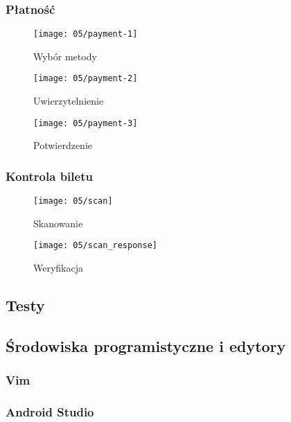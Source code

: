 \newpage

\subsubsection*{Płatność}

\begin{figure}[h]
	\centering
	\begin{minipage}[b]{0.3\textwidth}
		\texttt{[image: 05/payment-1]}
		\caption{Wybór metody}
	\end{minipage}
	\hfill
	\begin{minipage}[b]{0.3\textwidth}
		\texttt{[image: 05/payment-2]}
		\caption{Uwierzytelnienie}
	\end{minipage}
	\hfill
	\begin{minipage}[b]{0.3\textwidth}
		\texttt{[image: 05/payment-3]}
		\caption{Potwierdzenie}
	\end{minipage}
\end{figure}

\newpage

\subsubsection*{Kontrola biletu}

\begin{figure}[h]
	\centering
	\begin{minipage}[b]{0.35\textwidth}
		\texttt{[image: 05/scan]}
		\caption{Skanowanie}
	\end{minipage}
	\hspace{3cm}
	\begin{minipage}[b]{0.35\textwidth}
		\texttt{[image: 05/scan\_response]}
		\caption{Weryfikacja}
	\end{minipage}
\end{figure}

\newpage

\subsection{Testy}

\subsection{Środowiska programistyczne i edytory}
\subsubsection*{Vim}
\subsubsection*{Android Studio}
